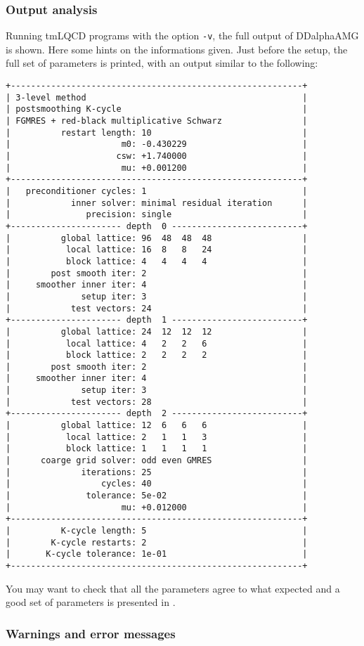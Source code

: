 \subsubsection{Output analysis\label{sec:DDalphaAMG_output}}
Running tmLQCD programs with the option \texttt{-v}, the full output of DDalphaAMG is shown. Here some hints on the informations given. Just before the setup, the full set of parameters is printed, with an output similar to the following:
\begin{Verbatim}[fontsize=\small]
+----------------------------------------------------------+
| 3-level method                                           |
| postsmoothing K-cycle                                    |
| FGMRES + red-black multiplicative Schwarz                |
|          restart length: 10                              |
|                      m0: -0.430229                       |
|                     csw: +1.740000                       |
|                      mu: +0.001200                       |
+----------------------------------------------------------+
|   preconditioner cycles: 1                               |
|            inner solver: minimal residual iteration      |
|               precision: single                          |
+---------------------- depth  0 --------------------------+
|          global lattice: 96  48  48  48                  |
|           local lattice: 16  8   8   24                  |
|           block lattice: 4   4   4   4                   |
|        post smooth iter: 2                               |
|     smoother inner iter: 4                               |
|              setup iter: 3                               |
|            test vectors: 24                              |
+---------------------- depth  1 --------------------------+
|          global lattice: 24  12  12  12                  |
|           local lattice: 4   2   2   6                   |
|           block lattice: 2   2   2   2                   |
|        post smooth iter: 2                               |
|     smoother inner iter: 4                               |
|              setup iter: 3                               |
|            test vectors: 28                              |
+---------------------- depth  2 --------------------------+
|          global lattice: 12  6   6   6                   |
|           local lattice: 2   1   1   3                   |
|           block lattice: 1   1   1   1                   |
|      coarge grid solver: odd even GMRES                  |
|              iterations: 25                              |
|                  cycles: 40                              |
|               tolerance: 5e-02                           |
|                      mu: +0.012000                       |
+----------------------------------------------------------+
|          K-cycle length: 5                               |
|        K-cycle restarts: 2                               |
|       K-cycle tolerance: 1e-01                           |
+----------------------------------------------------------+
\end{Verbatim}
You may want to check that all the parameters agree to what expected and a good set of parameters is presented in \cite{Alexandrou:2016}.
\subsubsection{Warnings and error messages}





